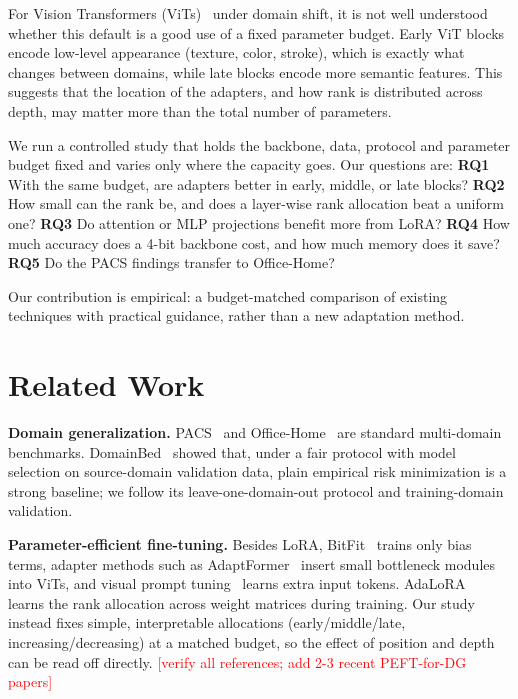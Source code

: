 \documentclass[10pt,twocolumn]{article}
\newcommand{\todo}[1]{\textcolor{red}{[#1]}}
\begin{document}
For Vision Transformers (ViTs)~\cite{dosovitskiy2021vit} under domain shift, it is not well understood whether
this default is a good use of a fixed parameter budget. Early ViT blocks encode low-level appearance (texture,
color, stroke), which is exactly what changes between domains, while late blocks encode more semantic
features. This suggests that the location of the adapters, and how rank is distributed across depth, may matter
more than the total number of parameters.

We run a controlled study that holds the backbone, data, protocol and parameter budget fixed and varies only
where the capacity goes. Our questions are:
\textbf{RQ1} With the same budget, are adapters better in early, middle, or late blocks?
\textbf{RQ2} How small can the rank be, and does a layer-wise rank allocation beat a uniform one?
\textbf{RQ3} Do attention or MLP projections benefit more from LoRA?
\textbf{RQ4} How much accuracy does a 4-bit backbone cost, and how much memory does it save?
\textbf{RQ5} Do the PACS findings transfer to Office-Home?

Our contribution is empirical: a budget-matched comparison of existing techniques with practical guidance,
rather than a new adaptation method.

\section{Related Work}
\textbf{Domain generalization.} PACS~\cite{li2017pacs} and Office-Home~\cite{venkateswara2017officehome} are
standard multi-domain benchmarks. DomainBed~\cite{gulrajani2021domainbed} showed that, under a fair protocol with
model selection on source-domain validation data, plain empirical risk minimization is a strong baseline; we
follow its leave-one-domain-out protocol and training-domain validation.

\textbf{Parameter-efficient fine-tuning.} Besides LoRA, BitFit~\cite{zaken2022bitfit} trains only bias terms,
adapter methods such as AdaptFormer~\cite{chen2022adaptformer} insert small bottleneck modules into ViTs, and
visual prompt tuning~\cite{jia2022vpt} learns extra input tokens. AdaLoRA~\cite{zhang2023adalora} learns the rank
allocation across weight matrices during training. Our study instead fixes simple, interpretable allocations
(early/middle/late, increasing/decreasing) at a matched budget, so the effect of position and depth can be read
off directly. \todo{verify all references; add 2-3 recent PEFT-for-DG papers}
\end{document}
